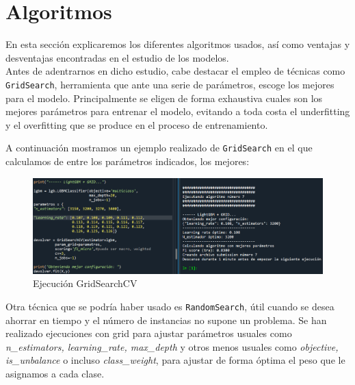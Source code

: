 	
	
	\section{Algoritmos}
	
		\hspace{1.5cm} En esta sección explicaremos los diferentes algoritmos usados, así como ventajas y desventajas encontradas en el estudio de los modelos. \\
	
	
	
	Antes de adentrarnos en dicho estudio, cabe destacar el  empleo de técnicas como \texttt{GridSearch}, herramienta que ante una serie de parámetros, escoge los mejores para el modelo. Principalmente se eligen de forma exhaustiva cuales son los mejores parámetros para entrenar el modelo, evitando a toda costa el underfitting y el overfitting que se produce en el proceso de entrenamiento.
	
	\newpage
	
	A continuación mostramos un ejemplo realizado de \texttt{GridSearch} en el que calculamos de entre los parámetros indicados, los mejores: \\
	
	\begin{figure}[H]
		\centering
		\includegraphics[width=1.1\textwidth]{img/Capturanew.png}
		\caption{Ejecución GridSearchCV}
	\end{figure}

	Otra técnica que se podría haber usado es \texttt{RandomSearch}, útil cuando se desea ahorrar en tiempo y el número de instancias no supone un problema. Se han realizado ejecuciones con grid para ajustar parámetros usuales como \textit{n\_estimators, learning\_rate, max\_depth} y otros menos usuales como \textit{objective, is\_unbalance} o incluso \textit{class\_weight}, para ajustar de forma óptima el peso que le asignamos a cada clase.
	
